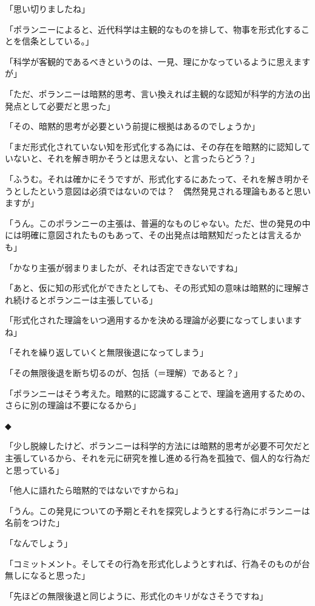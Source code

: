 \documentclass[paper=b5j]{jlreq}
\begin{document}
「思い切りましたね」

「ポランニーによると、近代科学は主観的なものを排して、物事を形式化することを信条としている。\cite[44]{polanyi1966ja}」

「科学が客観的であるべきというのは、一見、理にかなっているように思えますが」

「ただ、ポランニーは暗黙的思考、言い換えれば主観的な認知が科学的方法の出発点として必要だと思った」

「その、暗黙的思考が必要という前提に根拠はあるのでしょうか」

「まだ形式化されていない知を形式化する為には、その存在を暗黙的に認知していないと、それを解き明かそうとは思えない、と言ったらどう？」

「ふうむ。それは確かにそうですが、形式化するにあたって、それを解き明かそうとしたという意図は必須ではないのでは？　偶然発見される理論もあると思いますが」

「うん。このポランニーの主張は、普遍的なものじゃない。ただ、世の発見の中には明確に意図されたものもあって、その出発点は暗黙知だったとは言えるかも」

「かなり主張が弱まりましたが、それは否定できないですね」

「あと、仮に知の形式化ができたとしても、その形式知の意味は暗黙的に理解され続けるとポランニーは主張している\cite[45]{polanyi1966ja}」

「形式化された理論をいつ適用するかを決める理論が必要になってしまいますね」

「それを繰り返していくと無限後退になってしまう」

「その無限後退を断ち切るのが、包括（＝理解）であると？」

「ポランニーはそう考えた。暗黙的に認識することで、理論を適用するための、さらに別の理論は不要になるから」

◆

「少し脱線したけど、ポランニーは科学的方法には暗黙的思考が必要不可欠だと主張しているから、それを元に研究を推し進める行為を孤独で、個人的な行為だと思っている」

「他人に語れたら暗黙的ではないですからね」

「うん。この発見についての予期とそれを探究しようとする行為にポランニーは名前をつけた」

「なんでしょう」

「コミットメント。そしてその行為を形式化しようとすれば、行為そのものが台無しになると思った\cite[52]{polanyi1966ja}」

「先ほどの無限後退と同じように、形式化のキリがなさそうですね」
\end{document}
